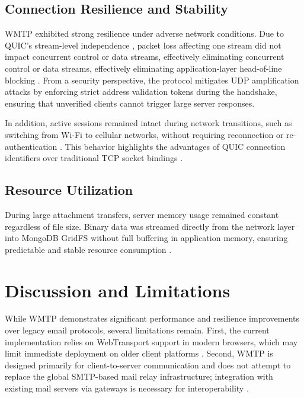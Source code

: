 \documentclass[10pt,a4paper]{article}
\begin{document}
\subsection{Connection Resilience and Stability}

WMTP exhibited strong resilience under adverse network
conditions. Due to QUIC’s stream-level independence
\cite{quic}, packet loss affecting one stream did not impact
concurrent control or data streams, effectively eliminating
concurrent control or data streams, effectively eliminating
application-layer head-of-line blocking \cite{quic, tls13}. From a security perspective, the protocol mitigates UDP amplification attacks by enforcing strict address validation tokens during the handshake, ensuring that unverified clients cannot trigger large server responses.

In addition, active sessions remained intact during network
transitions, such as switching from Wi-Fi to cellular
networks, without requiring reconnection or
re-authentication \cite{quic, webtransport}. This behavior
highlights the advantages of QUIC connection identifiers
over traditional TCP socket bindings \cite{smtp}.

\subsection{Resource Utilization}

During large attachment transfers, server memory usage
remained constant regardless of file size. Binary data was
streamed directly from the network layer into MongoDB
GridFS \cite{mongodb2024, gridfs2024} without full buffering in
application memory, ensuring predictable and stable
resource consumption \cite{klabnik2019, rustasync}.
\vspace{12pt}
\section{Discussion and Limitations}

While WMTP demonstrates significant performance and
resilience improvements over legacy email protocols, several
limitations remain. First, the current implementation relies on
WebTransport support in modern browsers, which may limit
immediate deployment on older client platforms \cite{webtransport}.
Second, WMTP is designed primarily for client-to-server
communication and does not attempt to replace the global
SMTP-based mail relay infrastructure; integration with existing
mail servers via gateways is necessary for interoperability
\cite{smtp, imap}.
\end{document}
